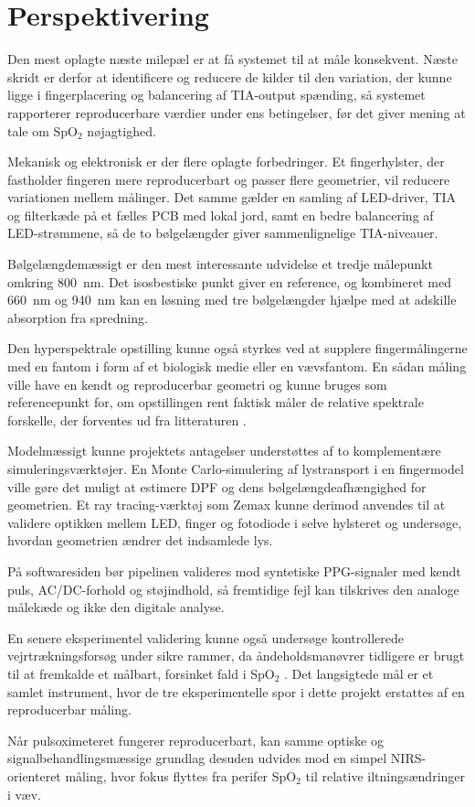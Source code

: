 \section{Perspektivering}
Den mest oplagte næste milepæl er at få systemet til at måle konsekvent. Næste skridt er derfor at identificere og reducere de kilder til den variation, der kunne ligge i fingerplacering og balancering af TIA-output spænding, så systemet rapporterer reproducerbare værdier under ens betingelser, før det giver mening at tale om SpO$_2$ nøjagtighed.

Mekanisk og elektronisk er der flere oplagte forbedringer. Et fingerhylster, der fastholder fingeren mere reproducerbart og passer flere geometrier, vil reducere variationen mellem målinger. Det samme gælder en samling af LED-driver, TIA og filterkæde på et fælles PCB med lokal jord, samt en bedre balancering af LED-strømmene, så de to bølgelængder giver sammenlignelige TIA-niveauer.

Bølgelængdemæssigt er den mest interessante udvidelse et tredje målepunkt omkring \SI{800}{nm}. Det isosbestiske punkt giver en reference, og kombineret med \SI{660}{nm} og \SI{940}{nm} kan en løsning med tre bølgelængder hjælpe med at adskille absorption fra spredning.

Den hyperspektrale opstilling kunne også styrkes ved at supplere fingermålingerne med en fantom i form af et biologisk medie eller en vævsfantom. En sådan måling ville have en kendt og reproducerbar geometri og kunne bruges som referencepunkt for, om opstillingen rent faktisk måler de relative spektrale forskelle, der forventes ud fra litteraturen \cite[s.~168]{Webster1997}.

Modelmæssigt kunne projektets antagelser understøttes af to komplementære simuleringsværktøjer. En Monte Carlo-simulering af lystransport i en fingermodel ville gøre det muligt at estimere DPF og dens bølgelængdeafhængighed for geometrien. Et ray tracing-værktøj som Zemax kunne derimod anvendes til at validere optikken mellem LED, finger og fotodiode i selve hylsteret og undersøge, hvordan geometrien ændrer det indsamlede lys.

På softwaresiden bør pipelinen valideres mod syntetiske PPG-signaler med kendt puls, AC/DC-forhold og støjindhold, så fremtidige fejl kan tilskrives den analoge målekæde og ikke den digitale analyse.

En senere eksperimentel validering kunne også undersøge kontrollerede vejrtrækningsforsøg under sikre rammer, da åndeholdsmanøvrer tidligere er brugt til at fremkalde et målbart, forsinket fald i SpO$_2$ \cite[s.~7]{YossefHay2018}. Det langsigtede mål er et samlet instrument, hvor de tre eksperimentelle spor i dette projekt erstattes af en reproducerbar måling.

Når pulsoximeteret fungerer reproducerbart, kan samme optiske og signalbehandlingsmæssige grundlag desuden udvides mod en simpel NIRS-orienteret måling, hvor fokus flyttes fra perifer SpO$_2$ til relative iltningsændringer i væv.
